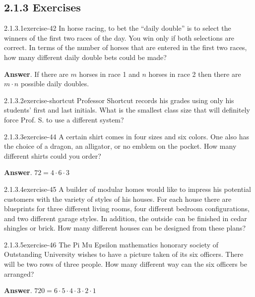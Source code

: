 \documentclass[twoside,10pt,]{book}
\numberwithin{equation}{section}
\begin{document}
\subsection*{2.1.3 Exercises}
\begin{divisionsolution}{2.1.3.1}{}{exercise-42}%
\hypertarget{p-580}{}%
In horse racing, to bet the ``daily double'' is to select the winners of the first two races of the day. You win only if both selections are correct. In terms of the number of horses that are entered in the first two races, how many different daily double bets could be made?%
\par\smallskip%
\noindent\textbf{Answer}.\quad%
\hypertarget{p-581}{}%
If there are \(m\) horses in race 1 and \(n\) horses in race 2 then there are \(m \cdot n\) possible daily doubles.%
\end{divisionsolution}%
\begin{divisionsolution}{2.1.3.2}{}{exercise-shortcut}%
\hypertarget{p-582}{}%
Professor Shortcut records his grades using only his students' first and last initials. What is the smallest class size that will definitely force Prof. S. to use a different system?%
\end{divisionsolution}%
\begin{divisionsolution}{2.1.3.3}{}{exercise-44}%
\hypertarget{p-583}{}%
A certain shirt comes in four sizes and six colors. One also has the choice of a dragon, an alligator, or no emblem on the pocket. How many different shirts could you order?%
\par\smallskip%
\noindent\textbf{Answer}.\quad%
\hypertarget{p-584}{}%
\(72=4\cdot 6\cdot 3\)%
\end{divisionsolution}%
\begin{divisionsolution}{2.1.3.4}{}{exercise-45}%
\hypertarget{p-585}{}%
A builder of modular homes would like to impress his potential customers with the variety of styles of his houses. For each house there are blueprints for three different living rooms, four different bedroom configurations, and two different garage styles. In addition, the outside can be finished in cedar shingles or brick. How many different houses can be designed from these plans?%
\end{divisionsolution}%
\begin{divisionsolution}{2.1.3.5}{}{exercise-46}%
\hypertarget{p-586}{}%
The Pi Mu Epsilon mathematics honorary society of Outstanding University wishes to have a picture taken of its six officers. There will be two rows of three people. How many different way can the six officers be arranged?%
\par\smallskip%
\noindent\textbf{Answer}.\quad%
\hypertarget{p-587}{}%
\(720=6\cdot 5\cdot 4\cdot 3\cdot 2\cdot 1\)%
\end{divisionsolution}%
\end{document}
